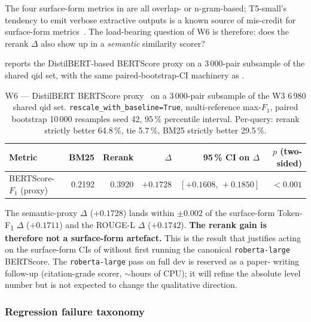 \documentclass[11pt,a4paper]{article}
\newcommand{\fdev}{6\,980}
\newcommand{\F}{F\textsubscript{1}}
\newcommand{\Tokenf}{Token-\F}
\newcommand{\rougel}{ROUGE-L}
\newcommand{\bertscore}{BERTScore}
\newcommand{\bmtwofive}{BM25}
\begin{document}
The four surface-form metrics in  are all overlap-
or n-gram-based; T5-small's tendency to emit verbose extractive
outputs is a known source of mis-credit for surface-form
metrics~\cite{lin2004rouge,papineni2002bleu}.  The load-bearing
question of W6 is therefore: does the rerank $\Delta$ also show up
in a \emph{semantic} similarity scorer?

 reports the DistilBERT-based \bertscore{}
proxy on a 3\,000-pair subsample of the shared qid set, with the
same paired-bootstrap-CI machinery as .

\begin{table}[H]
  \centering
  \caption{W6 --- DistilBERT \bertscore{} proxy~\cite{zhang2020bertscore,sanh2019distilbert}
  on a 3\,000-pair subsample of the W3 \fdev{} shared qid set.
  \texttt{rescale\_with\_baseline=True}, multi-reference max-$F_1$,
  paired bootstrap 10\,000 resamples seed 42, 95\,\% percentile
  interval.  Per-query: rerank strictly better 64.8\,\%, tie
  5.7\,\%, \bmtwofive{} strictly better 29.5\,\%.}
  \label{tab:w6-bertscore}
  \begin{tabular}{lrrrrr}
    \toprule
    Metric                       & \bmtwofive{} & Rerank & $\Delta$ & 95\,\% CI on $\Delta$ & $p$ (two-sided) \\
    \midrule
    \bertscore{}-$F_1$ (proxy)   & 0.2192       & 0.3920 & $\mathbf{+0.1728}$ & $[+0.1608,\,+0.1850]$ & $<0.001$ \\
    \bottomrule
  \end{tabular}
\end{table}

The semantic-proxy $\Delta$ ($+0.1728$) lands within $\pm 0.002$ of
the surface-form \Tokenf{} $\Delta$ ($+0.1711$) and the \rougel{}
$\Delta$ ($+0.1742$).  \textbf{The rerank gain is therefore not a
surface-form artefact.}  This is the result that justifies acting on
the surface-form CIs of  without first running the
canonical \texttt{roberta-large} \bertscore{}.  The
\texttt{roberta-large} pass on full dev is reserved as a paper-
writing follow-up (citation-grade scorer, $\sim\!$hours of CPU); it
will refine the absolute level number but is not expected to change
the qualitative direction.

\subsubsection{Regression failure taxonomy}
\label{sec:w6-taxonomy}
\end{document}
